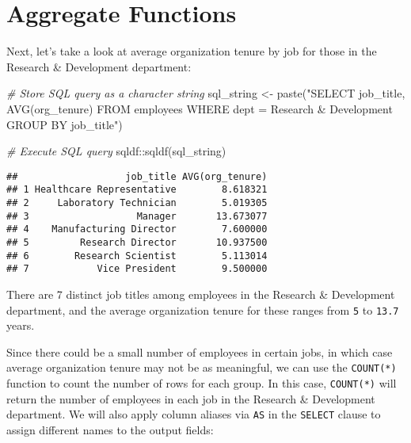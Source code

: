 \documentclass[
]{book}
\newenvironment{Shaded}{\begin{snugshade}}{\end{snugshade}}
\newcommand{\CommentTok}[1]{\textcolor[rgb]{0.56,0.35,0.01}{\textit{#1}}}
\newcommand{\FunctionTok}[1]{\textcolor[rgb]{0.00,0.00,0.00}{#1}}
\newcommand{\NormalTok}[1]{#1}
\newcommand{\OtherTok}[1]{\textcolor[rgb]{0.56,0.35,0.01}{#1}}
\newcommand{\SpecialCharTok}[1]{\textcolor[rgb]{0.00,0.00,0.00}{#1}}
\newcommand{\StringTok}[1]{\textcolor[rgb]{0.31,0.60,0.02}{#1}}
\begin{document}
\hypertarget{aggregate-functions}{%
\section{Aggregate Functions}\label{aggregate-functions}}

Next, let's take a look at average organization tenure by job for those in the Research \& Development department:

\begin{Shaded}
\begin{Highlighting}[]
\CommentTok{\# Store SQL query as a character string}
\NormalTok{sql\_string }\OtherTok{\textless{}{-}} \FunctionTok{paste}\NormalTok{(}\StringTok{"SELECT}
\StringTok{                      job\_title,}
\StringTok{                      AVG(org\_tenure)}
\StringTok{                    FROM}
\StringTok{                      employees}
\StringTok{                    WHERE}
\StringTok{                      dept = \textquotesingle{}Research \& Development\textquotesingle{}}
\StringTok{                    GROUP BY}
\StringTok{                      job\_title"}\NormalTok{)}

\CommentTok{\# Execute SQL query}
\NormalTok{sqldf}\SpecialCharTok{::}\FunctionTok{sqldf}\NormalTok{(sql\_string)}
\end{Highlighting}
\end{Shaded}

\begin{verbatim}
##                   job_title AVG(org_tenure)
## 1 Healthcare Representative        8.618321
## 2     Laboratory Technician        5.019305
## 3                   Manager       13.673077
## 4    Manufacturing Director        7.600000
## 5         Research Director       10.937500
## 6        Research Scientist        5.113014
## 7            Vice President        9.500000
\end{verbatim}

There are 7 distinct job titles among employees in the Research \& Development department, and the average organization tenure for these ranges from \texttt{5} to \texttt{13.7} years.

Since there could be a small number of employees in certain jobs, in which case average organization tenure may not be as meaningful, we can use the \texttt{COUNT(*)} function to count the number of rows for each group. In this case, \texttt{COUNT(*)} will return the number of employees in each job in the Research \& Development department. We will also apply column aliases via \texttt{AS} in the \texttt{SELECT} clause to assign different names to the output fields:
\end{document}
